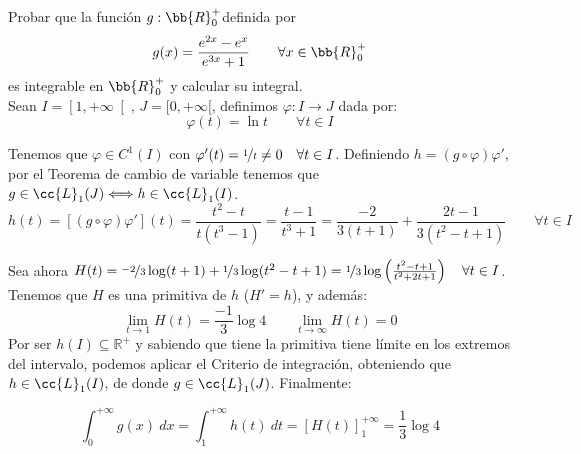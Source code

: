 \begin{ejercicio} Probar que la función $g:\bb{R}_0^+$definida por
    \begin{equation*}
        g(x) = \frac{e^{2x}-e^x}{e^{3x}+1}
        \qquad \forall x\in \bb{R}_0^+
    \end{equation*}
    es integrable en $\bb{R}_0^+$ y calcular su integral.\\

    Sean $I=\left[1,+\infty\right[$, $J=[0,+\infty[$, definimos $\varphi:I\longrightarrow J$ dada por:
    \begin{equation*}
        \varphi(t) = \ln t \qquad \forall t\in I
    \end{equation*}
    
    Tenemos que $\varphi \in C^1(I)$ con $\varphi'(t) = \nicefrac{1}{t}\neq 0 \quad \forall t\in I$. Definiendo $h=(g\circ \varphi)\varphi'$, por el Teorema de cambio de variable tenemos que $g\in \cc{L}_1(J)\Longleftrightarrow h\in \cc{L}_1(I)$.
    \begin{equation*}
        h(t) = [(g\circ \varphi)\varphi'](t) = \dfrac{t^2-t}{t(t^3-1)} = \dfrac{t-1}{t^3 + 1} = \dfrac{-2}{3(t+1)} + \dfrac{2t-1}{3(t^2-t+1)}\qquad \forall t\in I
    \end{equation*}

    Sea ahora $H(t) = \nicefrac{-2}{3}\log(t+1)+\nicefrac{1}{3}\log(t^2-t+1) = \nicefrac{1}{3}\log\left(\frac{t^2-t+1}{t^2+2t+1}\right)\quad \forall t\in I$. Tenemos que $H$ es una primitiva de $h$ ($H'=h$), y además:
    \begin{equation*}
        \lim_{t\to1}H(t) = \frac{-1}{3}\log4 \qquad \lim_{t\to\infty}H(t) = 0
    \end{equation*}
    Por ser $h(I) \subseteq \mathbb{R}^+$ y sabiendo que tiene la primitiva tiene límite en los extremos del intervalo,
    podemos aplicar el Criterio de integración, obteniendo que $h\in \cc{L}_1(I)$, de donde $g\in \cc{L}_1(J)$. Finalmente:

    \begin{equation*}
        \displaystyle\int_{0}^{+\infty} g(x)~dx = \displaystyle\int_{1}^{+\infty} h(t)~dt = \left[H(t)\right]_1^{+\infty} = \frac{1}{3}\log4
    \end{equation*}
\end{ejercicio}
